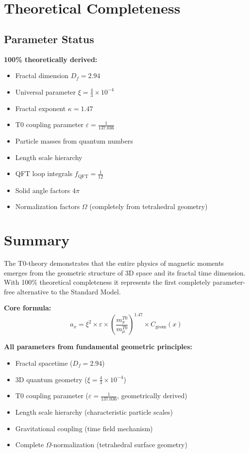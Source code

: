 \documentclass[12pt,a4paper]{article}
\numberwithin{equation}{section}
\newcommand{\xipar}{\xi}
\newcommand{\epsilonT}{\varepsilon}
\newcommand{\Cgeom}{C_{\text{geom}}}
\newcommand{\fQFT}{f_{\text{QFT}}}
\newcommand{\kappaT}{\kappa}
\newcommand{\Df}{D_f}
\newcommand{\Omegafactor}{\Omega}
\begin{document}
	\section{Theoretical Completeness}
	
	\subsection{Parameter Status}
	
	\textbf{100\% theoretically derived:}
	\begin{itemize}
		\item Fractal dimension $\Df = 2.94$
		\item Universal parameter $\xipar = \frac{4}{3} \times 10^{-4}$
		\item Fractal exponent $\kappaT = 1.47$
		\item T0 coupling parameter $\epsilonT = \frac{1}{137.036}$
		\item Particle masses from quantum numbers
		\item Length scale hierarchy
		\item QFT loop integrals $\fQFT = \frac{1}{12}$
		\item Solid angle factors $4\pi$
		\item Normalization factors $\Omegafactor$ (completely from tetrahedral geometry)
	\end{itemize}
	
	
	\section{Summary}
	
	The T0-theory demonstrates that the entire physics of magnetic moments emerges from the geometric structure of 3D space and its fractal time dimension. With 100\% theoretical completeness it represents the first completely parameter-free alternative to the Standard Model.
	
	\textbf{Core formula:}
	\begin{equation}
		a_x = \xipar^2 \times \epsilonT \times \left(\frac{m_x^{T0}}{m_\mu^{T0}}\right)^{1.47} \times \Cgeom(x)
		\label{eq:core_formula}
	\end{equation}
	
	\textbf{All parameters from fundamental geometric principles:}
	\begin{itemize}
		\item Fractal spacetime ($\Df = 2.94$)
		\item 3D quantum geometry ($\xipar = \frac{4}{3} \times 10^{-4}$)
		\item T0 coupling parameter ($\epsilonT = \frac{1}{137.036}$, geometrically derived)
		\item Length scale hierarchy (characteristic particle scales)
		\item Gravitational coupling (time field mechanism)
		\item Complete $\Omegafactor$-normalization (tetrahedral surface geometry)
	\end{itemize}
	
\end{document}
